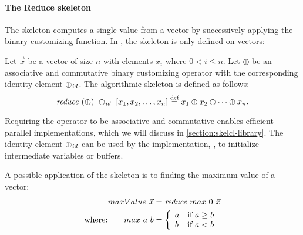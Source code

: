 \paragraph{The Reduce skeleton}
The \reduce skeleton computes a single value from a vector by successively applying the binary customizing function.
In \SkelCL, the \reduce skeleton is only defined on vectors:
\begin{definition}
  \label{definition:reduce}
  Let $\vec{x}$ be a vector of size $n$ with elements $x_i$ where $0 < i \leq n$.
  Let $\oplus$ be an associative and commutative binary customizing operator with the corresponding identity element $\oplus_{\text{\textit{id}}}$.
  The algorithmic skeleton \reduce is defined as follows:
  \begin{equation*}
    \reduce\ (\oplus)\ \oplus_{\id}\ [x_1, x_2, \dots, x_n]
      \eqdef x_1 \oplus x_2 \oplus \dots \oplus x_n .
  \end{equation*}
\end{definition}
\noindent
Requiring the operator to be associative and commutative enables efficient parallel implementations, which we will discuss in \autoref{section:skelcl-library}.
The identity element $\oplus_{\text{\textit{id}}}$ can be used by the implementation, \eg, to initialize intermediate variables or buffers.

A possible application of the \reduce skeleton is to finding the maximum value of a vector:
\begin{align*}
  maxValue\ \vec{x} &= \text{\textit{reduce}}\ max\ 0\ \vec{x}\\
  \text{where:} \qquad max\ a\ b &=
    \left\{
      \begin{array}{l l}
      a & \text{if } a \geq b\\
      b & \text{if } a < b
      \end{array}
    \right.
\end{align*}


